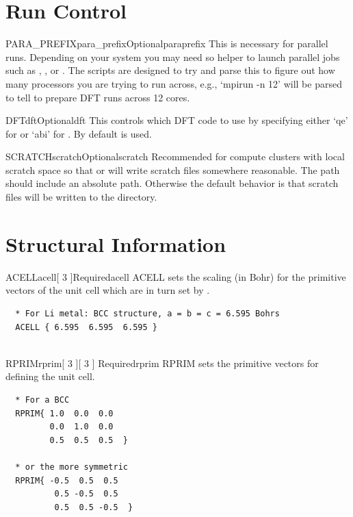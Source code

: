 \documentclass[11pt]{report}
\begin{document}
\section{Run Control}
\label{sec:Run-Control}

\begin{Card}{PARA\_PREFIX}{para\_prefix}{Optional}{paraprefix}
This is necessary for parallel runs. Depending on your system you may need so helper to launch parallel jobs such as , 
, or . The  scripts are designed to try and parse this to figure out how many processors 
you are trying to run across, e.g., `mpirun -n 12' will be parsed to tell  to prepare DFT runs across 12 cores. 
\end{Card}

\begin{Card}{DFT}{dft}{Optional}{dft}
This controls which DFT code to use by specifying either `qe' for  or `abi' for . 
By default  is used.
\end{Card}

\begin{Card}{SCRATCH}{scratch}{Optional}{scratch}
Recommended for compute clusters with local scratch space so that  or  
will write scratch files somewhere reasonable. The path  should include an absolute path. Otherwise the default 
behavior is that scratch files will be written to the  directory. 
\end{Card}


\section{Structural Information}
\label{sec:Structural-Information}



\begin{Card}{ACELL}{acell[ 3 ]}{Required}{acell}
  ACELL sets the scaling (in Bohr) for the primitive vectors of the unit cell which are in turn set by .

\begin{verbatim}
  * For Li metal: BCC structure, a = b = c = 6.595 Bohrs
  ACELL { 6.595  6.595  6.595 }
  
  \end{verbatim}
\end{Card}

\begin{Card}{RPRIM}{rprim[ 3 ][ 3 ] }{Required}{rprim}
  RPRIM sets the primitive vectors for defining the unit cell. 
  
  \begin{verbatim}
  * For a BCC
  RPRIM{ 1.0  0.0  0.0
         0.0  1.0  0.0
         0.5  0.5  0.5  }
  
  * or the more symmetric
  RPRIM{ -0.5  0.5  0.5
          0.5 -0.5  0.5
          0.5  0.5 -0.5  }
         
  \end{verbatim}
\end{Card}
\end{document}
